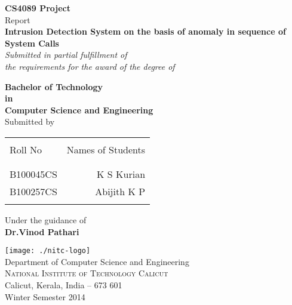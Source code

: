 \begin{titlepage}

\begin{center}

\textup{\small {\bf CS4089 Project} \\ Report}\\[0.2in]

\Large \textbf {Intrusion Detection System on the basis of anomaly in sequence of System Calls}\\[0.5in]

       \small \emph{Submitted in partial fulfillment of\\
        the requirements for the award of the degree of}
        \vspace{.2in}

       {\bf Bachelor of Technology \\in\\ Computer Science and Engineering}\\[0.5in]

\normalsize Submitted by \\
\begin{table}[h]
\centering
\begin{tabular}{lr}\hline \\
Roll No & Names of Students \\ \\ \hline
\\
B100045CS & K S Kurian \\
B100257CS & Abijith K P \\ \\ \hline 
\end{tabular}
\end{table}

\vspace{.1in}
Under the guidance of\\
{\textbf{Dr.Vinod Pathari}}\\[0.2in]

\vfill

\texttt{[image: ./nitc-logo]}\\[0.1in]
\Large{Department of Computer Science and Engineering}\\
\normalsize
\textsc{National Institute of Technology Calicut}\\
Calicut, Kerala, India -- 673 601 \\
\vspace{0.2cm}
Winter Semester 2014

\end{center}

\end{titlepage}
